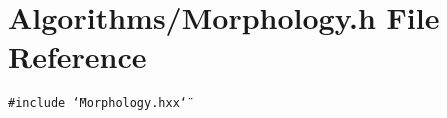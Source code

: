 \section{Algorithms/Morphology.h File Reference}
\label{Morphology_8h}
{\tt \#include \char`\"{}Morphology.hxx\char`\"{}}\par
